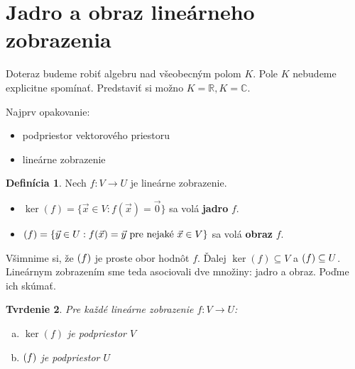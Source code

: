 \documentclass[11pt,a4paper]{article}
\theoremstyle{definition}
\newtheorem{definicia}{Definícia}[section]
\theoremstyle{plain}
\newtheorem{tvrdenie}[definicia]{Tvrdenie}
\theoremstyle{remark}
\newcommand{\R}{\mathbb{R}}
\newcommand{\C}{\mathbb{C}}
\let\Im\relax
\DeclareMathOperator{\Im}{Im}
\begin{document}
\setcounter{section}{2}
\setcounter{subsection}{1}

\section{Jadro a obraz lineárneho zobrazenia}

Doteraz budeme robiť algebru nad všeobecným polom $K$. Pole $K$ nebudeme explicitne spomínať. Predstaviť si možno $K = \R, K = \C$.

Najprv opakovanie:
\begin{itemize}
    \item podpriestor vektorového priestoru
    \item lineárne zobrazenie
\end{itemize}

\begin{definicia} \label{def:jadro_a_obraz}
Nech $f: V \to U$ je lineárne zobrazenie.
\begin{itemize}
    \item $\ker(f) = \{ \vec{x} \in V : f(\vec{x}) = \vec{0} \}$ sa volá \textbf{jadro} $f$.
    \item $\Im(f) = \{ \vec{y} \in U : f(\vec{x}) = \vec{y} \text{ pre nejaké } \vec{x} \in V \}$ sa volá \textbf{obraz} $f$.
\end{itemize}
\end{definicia}

Všimnime si, že $\Im(f)$ je proste obor hodnôt $f$. Ďalej $\ker(f) \subseteq V$ a $\Im(f) \subseteq U$. Lineárnym zobrazením sme teda asociovali dve množiny: jadro a obraz. Poďme ich skúmať.

\begin{tvrdenie} \label{tvr:podpriestory}
Pre každé lineárne zobrazenie $f: V \to U$:
\begin{enumerate}[a)]
    \item $\ker(f)$ je podpriestor $V$
    \item $\Im(f)$ je podpriestor $U$
\end{enumerate}
\end{tvrdenie}
\end{document}
